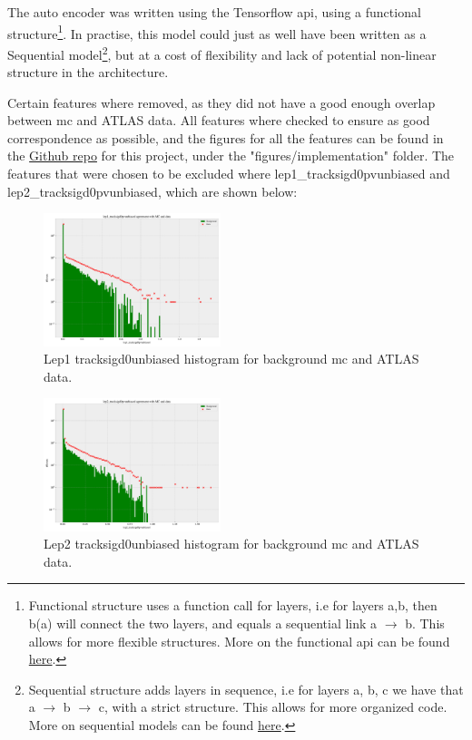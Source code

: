 \documentclass[ reprint, amsmath,amssymb, aps, nofootinbib]{revtex4-2}
\begin{document}
The auto encoder was written using the Tensorflow api\cite{tensorflow2015-whitepaper}\cite{chollet2015keras}, using a functional structure\footnote{Functional structure uses a function call for layers, i.e for layers a,b, then b(a) will connect the two layers, and equals a sequential link a $\to$ b. This allows for more flexible structures. More on the functional api can be found \href{https://www.tensorflow.org/guide/keras/functional}{here}.}. In practise, this model could just as well have been written as a Sequential model\footnote{Sequential structure adds layers in sequence, i.e for layers a, b, c we have that a $\to$ b $\to$ c, with a strict structure. This allows for more organized code. More on sequential models can be found \href{https://www.tensorflow.org/guide/keras/sequential_model}{here}.}, but at a cost of flexibility and lack of potential non-linear structure in the architecture. \par 

Certain features where removed, as they did not have a good enough overlap between mc and ATLAS data. All features where checked to ensure as good correspondence as possible, and the figures for all the features can be found in the \href{https://github.com/Gadangadang/FYS5555/tree/main/Project3}{Github repo} for this project, under the "figures/implementation" folder. The features that were chosen to be excluded where lep1\_tracksigd0pvunbiased and lep2\_tracksigd0pvunbiased, which are shown below:

\begin{figure}[H]
    \centering
    \includegraphics[width=0.46\textwidth]{figures/implementation/lep1_tracksigd0pvunbiased.pdf}
    \caption{Lep1 tracksigd0unbiased histogram for background mc and ATLAS data. }
    \label{fig:lep1sigd0}
\end{figure}

\begin{figure}[H]
    \centering
    \includegraphics[width=0.46\textwidth]{figures/implementation/lep2_tracksigd0pvunbiased.pdf}
    \caption{Lep2 tracksigd0unbiased histogram for background mc and ATLAS data.}
    \label{fig:lep2sigd0}
\end{figure}
\end{document}
